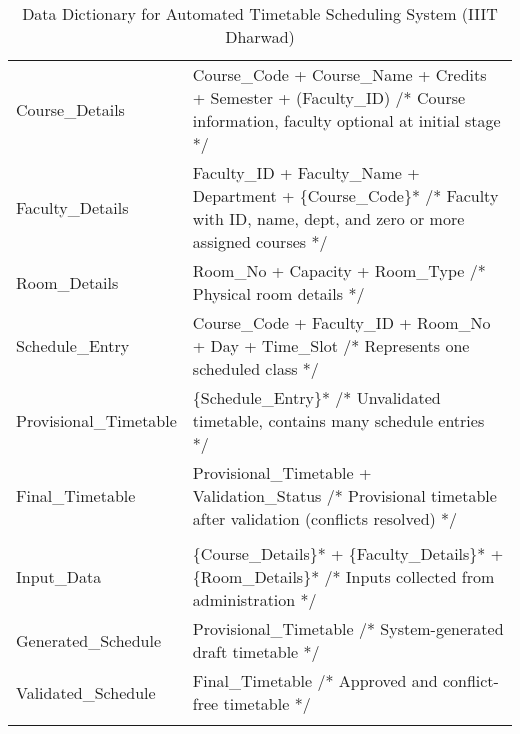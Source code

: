 \documentclass[12pt]{article}
\begin{document}
\begin{longtable}{|>{\raggedright\arraybackslash}p{}|
                        >{\raggedright\arraybackslash}p{}|}
\multicolumn{2}{|c|}{\textbf{Composite Data Items}} \\
\hline
Course\_Details & Course\_Code + Course\_Name + Credits + Semester + (Faculty\_ID) \newline
/* Course information, faculty optional at initial stage */ \\
Faculty\_Details & Faculty\_ID + Faculty\_Name + Department + \{Course\_Code\}* \newline
/* Faculty with ID, name, dept, and zero or more assigned courses */ \\
Room\_Details & Room\_No + Capacity + Room\_Type \newline
/* Physical room details */ \\
Schedule\_Entry & Course\_Code + Faculty\_ID + Room\_No + Day + Time\_Slot \newline
/* Represents one scheduled class */ \\
Provisional\_Timetable & \{Schedule\_Entry\}* \newline
/* Unvalidated timetable, contains many schedule entries */ \\
Final\_Timetable & Provisional\_Timetable + Validation\_Status \newline
/* Provisional timetable after validation (conflicts resolved) */ \\
\hline

\multicolumn{2}{|c|}{\textbf{Data Flows}} \\
\hline
Input\_Data & \{Course\_Details\}* + \{Faculty\_Details\}* + \{Room\_Details\}* \newline
/* Inputs collected from administration */ \\
Generated\_Schedule & Provisional\_Timetable \newline
/* System-generated draft timetable */ \\
Validated\_Schedule & Final\_Timetable \newline
/* Approved and conflict-free timetable */ \\
\hline

\caption{Data Dictionary for Automated Timetable Scheduling System (IIIT Dharwad)} \\

\end{longtable}
\newpage
\end{document}

